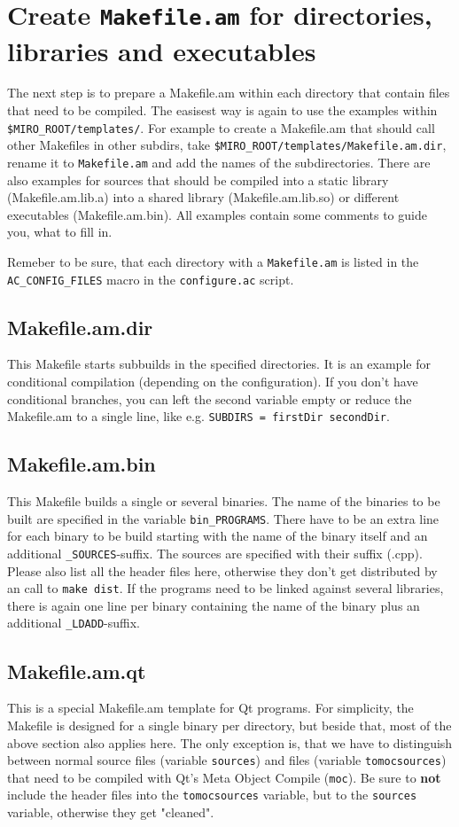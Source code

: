 \section{Create {\tt Makefile.am} for directories, libraries and executables}

The next step is to prepare a Makefile.am within each directory that
contain files that need to be compiled. The easisest way is again to
use the examples within {\tt \$MIRO\_ROOT/\-templates/}. For example to
create a Makefile.am that should call other Makefiles in other
subdirs, take {\tt \$MIRO\_ROOT/\-templates/\-Makefile.am.dir}, rename it to
{\tt Makefile.am} and add the names of the subdirectories. There are also
examples for sources that should be compiled into a static library
(Makefile.am.lib.a) into a shared library (Makefile.am.lib.so) or
different executables (Makefile.am.bin). All examples contain some
comments to guide you, what to fill in.

Remeber to be sure, that each directory with a {\tt Makefile.am} is
listed in the {\tt AC\_CONFIG\_FILES} macro in the {\tt configure.ac}
script.


\subsection{Makefile.am.dir}
This Makefile starts subbuilds in the specified directories. It is an
example for conditional compilation (depending on the
configuration). If you don't have conditional branches, you can left
the second variable empty or reduce the Makefile.am to a single line,
like e.g. \texttt{SUBDIRS = firstDir secondDir}.

\subsection{Makefile.am.bin}
This Makefile builds a single or several binaries. The name of the
binaries to be built are specified in the variable {\tt bin\_PROGRAMS}.
There have to be an extra line for each binary to be build starting
with the name of the binary itself and an additional
\texttt{\_SOURCES}-suffix. The sources are specified with their suffix
(.cpp). Please also list all the header files here, otherwise they
don't get distributed by an call to \texttt{make dist}. If the
programs need to be linked against several libraries, there is again
one line per binary containing the name of the binary plus an
additional \texttt{\_LDADD}-suffix.

\subsection{Makefile.am.qt}
This is a special Makefile.am template for Qt programs. For
simplicity, the Makefile is designed for a single binary per
directory, but beside that, most of the above section also applies
here. The only exception is, that we have to distinguish between
normal source files (variable \texttt{sources}) and files (variable
\texttt{tomocsources}) that need to be compiled with Qt's Meta Object
Compile (\texttt{moc}). Be sure to \textbf{not} include the header
files into the \texttt{tomocsources} variable, but to the
\texttt{sources} variable, otherwise they get "cleaned".

